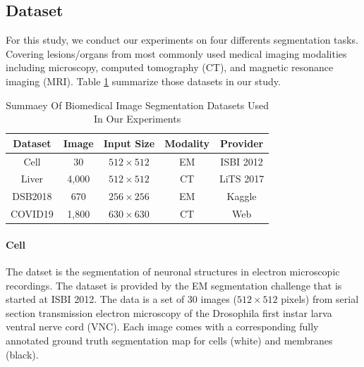 \documentclass[UTF8]{article} %
\begin{document}
\subsection{Dataset}
For this study, we conduct our experiments on four differents segmentation tasks. 
Covering lesions/organs from most commonly used medical imaging modalities including microscopy, 
computed tomography (CT), and magnetic resonance imaging (MRI).  Table \ref{dataset-table} summarize those datasets in our study.

\begin{table}[htbp]
    \vspace{-2mm}
    \begin{center}\small
    \label{dataset-table}
    \begin{tabular}{ccccc}
      
    \toprule
    Dataset & Image & Input Size & Modality & Provider\\
    \midrule
    Cell & 30 & $512\times 512$  & EM      & ISBI 2012\cite{isbicell}   \\
    Liver    & 4,000 & $512\times 512$       & CT     & LiTS 2017\cite{liver}  \\
    DSB2018      & 670 & $256\times 256$      & EM      & Kaggle\cite{dsb2018} \\
    COVID19         & 1,800 & $630\times 630$     & CT     & Web\cite{covid19,covid19_2}  \\
  \bottomrule    
    \end{tabular}
    \caption{Summaey Of Biomedical Image Segmentation Datasets Used In Our Experiments}
  \end{center}
    \vspace{-4mm}
\end{table}
  


\paragraph{Cell}
The datset is the segmentation of neuronal structures in electron microscopic recordings.
The dataset is provided by the EM segmentation challenge\cite{isbicell} that is started at ISBI 2012.
The data is a set of 30 images ($512\times 512$ pixels) from serial section transmission electron
microscopy of the Drosophila first instar larva ventral nerve cord (VNC). Each image comes with a corresponding fully annotated ground truth segmentation
map for cells (white) and membranes (black).
\end{document}
